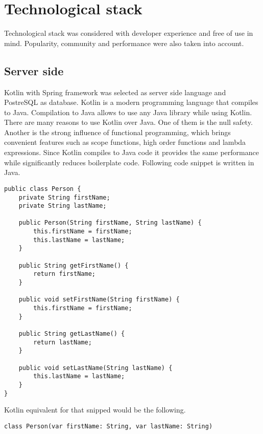 
\section{Technological stack}\label{sec:technological-stack}

Technological stack was considered with developer experience and free of use in mind.
Popularity, community and performance were also taken into account.

\subsection{Server side}\label{subsec:ts-server-side}

Kotlin with Spring framework was selected as server side language and PostreSQL as database.\cite{kotlin, spring, postgresql}
Kotlin is a modern programming language that compiles to Java.
Compilation to Java allows to use any Java library while using Kotlin.
There are many reasons to use Kotlin over Java.
One of them is the null safety.
Another is the strong influence of functional programming, which brings convenient features such as scope functions, high order functions and lambda expressions.
Since Kotlin compiles to Java code it provides the same performance while significantly reduces boilerplate code.
Following code snippet is written in Java.\\

\begin{Verbatim}[frame=single]
public class Person {
    private String firstName;
    private String lastName;

    public Person(String firstName, String lastName) {
        this.firstName = firstName;
        this.lastName = lastName;
    }

    public String getFirstName() {
        return firstName;
    }

    public void setFirstName(String firstName) {
        this.firstName = firstName;
    }

    public String getLastName() {
        return lastName;
    }

    public void setLastName(String lastName) {
        this.lastName = lastName;
    }
}
\end{Verbatim}

Kotlin equivalent for that snipped would be the following.\\
\begin{Verbatim}[frame=single]
class Person(var firstName: String, var lastName: String)
\end{Verbatim}

